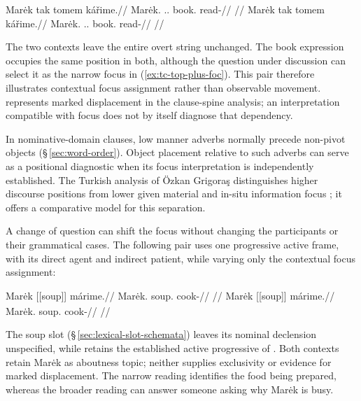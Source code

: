\pex\label{ex:tc-top-foc}
\a\label{ex:tc-top-only}%
\begingl
\gla Marėk tak tomem kářime.//
\glb Marėk.\Dir{} \Dem{}.\Prox{}.\Dir{} book.\Ind{} read-\Prog{}//
\glft {}
      //
\endgl
\a\label{ex:tc-top-plus-foc}%
\begingl
\gla Marėk tak tomem kářime.//
\glb Marėk.\Dir{} \Dem{}.\Prox{}.\Dir{} book.\Ind{} read-\Prog{}//
\glft {}
      //
\endgl
\xe

\noindent The two contexts leave the entire overt string unchanged. The
 book expression occupies the same position in both, although the question
 under discussion can select it as the narrow focus in
 (\ref{ex:tc-top-plus-foc}). This pair therefore illustrates contextual focus
 assignment rather than observable movement.  represents marked
 displacement in the clause-spine analysis; an interpretation compatible with
 focus does not by itself diagnose that dependency.

In nominative-domain clauses, low manner adverbs normally precede
 non-pivot objects (§\,\ref{sec:word-order}).
 Object placement relative to such adverbs can serve as a positional
 diagnostic when its focus interpretation is independently established.
 The Turkish analysis of Özkan Grigoraş distinguishes higher discourse
 positions from lower given material and in-situ information focus
 \cite[§\,4.4.2]{ozkangrigoras2020}; it offers a comparative model for this separation.

A change of question can shift the focus without changing the participants
or their grammatical cases. The following pair uses one progressive active
frame, with its direct agent and indirect patient, while varying only the
contextual focus assignment:

\pex\label{ex:tc-illustrative-focus}
\a
\begingl
\gla Marėk \textnormal{[[soup]]}\textsubscript{\Ind{}} márime.//
\glb Marėk.\Dir{} soup.\Ind{} cook-\Prog{}//
\glft {}
//
\endgl
\a
\begingl
\gla Marėk \textnormal{[[soup]]}\textsubscript{\Ind{}} márime.//
\glb Marėk.\Dir{} soup.\Ind{} cook-\Prog{}//
\glft {}
//
\endgl
\xe

The soup slot (§\,\ref{sec:lexical-slot-schemata}) leaves its nominal
declension unspecified, while  retains the established active
progressive of  . Both contexts retain Marėk as
aboutness topic; neither supplies exclusivity or evidence for marked
displacement. The narrow reading identifies the food being prepared, whereas
the broader reading can answer someone asking why Marėk is busy.

